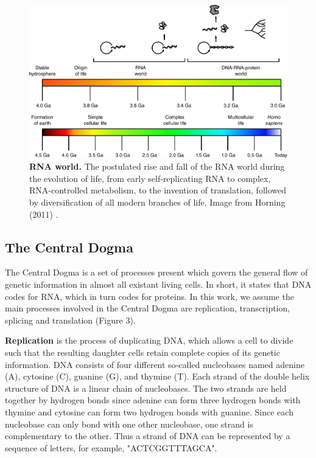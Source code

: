 \begin{figure}[htb!]
	\centering\includegraphics[width=.5\linewidth]{fig/rnaworld} %
	\caption{
		\textbf{RNA world.} The postulated rise and fall of the RNA world during the evolution of life, from early self-replicating RNA to complex, RNA-controlled metabolism, to the invention of translation, followed by diversification of all modern branches of life. Image from Horning (2011) \cite{horning_rnaworld_2011}. %
	}
	\label{fig:rnaworld}
\end{figure}

\subsection{The Central Dogma}
The Central Dogma is a set of processes present which govern the general flow of genetic information in almost all existant living cells. In short, it states that DNA codes for RNA, which in turn codes for proteins. In this work, we assume the main processes involved in the Central Dogma are replication, transcription, splicing and translation (Figure 3). 

\textbf{Replication} is the process of duplicating DNA, which allows a cell to divide such that the resulting daughter cells retain complete copies of its genetic information. DNA consists of four different so-called nucleobases named adenine (A), cytosine (C), guanine (G), and thymine (T). Each strand of the double helix structure of DNA is a linear chain of nucleobases. The two strands are held together by hydrogen bonds since adenine can form three hydrogen bonds with thymine and cytosine can form two hydrogen bonds with guanine. Since each nucleobase can only bond with one other nucleobase, one strand is complementary to the other. Thus a strand of DNA can be represented by a sequence of letters, for example, "ACTCGGTTTAGCA". %

